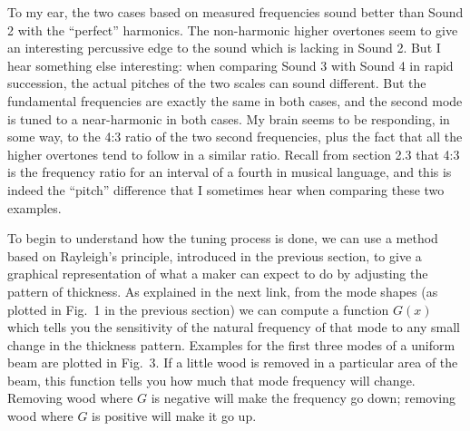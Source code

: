   To my ear, the two cases based on measured frequencies sound better than 
  Sound 2 with the ``perfect'' harmonics. The non-harmonic higher overtones 
  seem to give an interesting percussive edge to the sound which is lacking in 
  Sound 2. But I hear something else interesting: when comparing Sound 3 with 
  Sound 4 in rapid succession, the actual pitches of the two scales can sound 
  different. But the fundamental frequencies are exactly the same in both 
  cases, and the second mode is tuned to a near-harmonic in both cases. My 
  brain seems to be responding, in some way, to the 4:3 ratio of the two second 
  frequencies, plus the fact that all the higher overtones tend to follow in a 
  similar ratio. Recall from section 2.3 that 4:3 is the frequency ratio for an 
  interval of a fourth in musical language, and this is indeed the ``pitch'' 
  difference that I sometimes hear when comparing these two examples. 





  To begin to understand how the tuning process is done, we can use a method 
  based on Rayleigh's principle, introduced in the previous section, to give a 
  graphical representation of what a maker can expect to do by adjusting the 
  pattern of thickness. As explained in the next link, from the mode shapes (as 
  plotted in Fig.\ 1 in the previous section) we can compute a function $G(x)$ 
  which tells you the sensitivity of the natural frequency of that mode to any 
  small change in the thickness pattern. Examples for the first three modes of 
  a uniform beam are plotted in Fig.\ 3. If a little wood is removed in a 
  particular area of the beam, this function tells you how much that mode 
  frequency will change. Removing wood where $G$ is negative will make the 
  frequency go down; removing wood where $G$ is positive will make it go up. 

